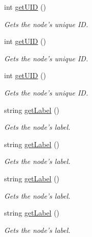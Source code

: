 \begin{DoxyCompactItemize}
int \hyperlink{classAST_ab7a5b1d9f1c2de0d98deb356f724a42c}{get\-U\-I\-D} ()
\begin{DoxyCompactList}\small\item\em Gets the node's unique I\-D. \end{DoxyCompactList}\item 
int \hyperlink{classAST_ab7a5b1d9f1c2de0d98deb356f724a42c}{get\-U\-I\-D} ()
\begin{DoxyCompactList}\small\item\em Gets the node's unique I\-D. \end{DoxyCompactList}\item 
int \hyperlink{classAST_ab7a5b1d9f1c2de0d98deb356f724a42c}{get\-U\-I\-D} ()
\begin{DoxyCompactList}\small\item\em Gets the node's unique I\-D. \end{DoxyCompactList}\item 
string \hyperlink{classAST_aee029be902fffc927d16ccb03eb922ad}{get\-Label} ()
\begin{DoxyCompactList}\small\item\em Gets the node's label. \end{DoxyCompactList}\item 
string \hyperlink{classAST_aee029be902fffc927d16ccb03eb922ad}{get\-Label} ()
\begin{DoxyCompactList}\small\item\em Gets the node's label. \end{DoxyCompactList}\item 
string \hyperlink{classAST_aee029be902fffc927d16ccb03eb922ad}{get\-Label} ()
\begin{DoxyCompactList}\small\item\em Gets the node's label. \end{DoxyCompactList}\item 
string \hyperlink{classAST_aee029be902fffc927d16ccb03eb922ad}{get\-Label} ()
\begin{DoxyCompactList}\small\item\em Gets the node's label. \end{DoxyCompactList}\end{DoxyCompactItemize}
